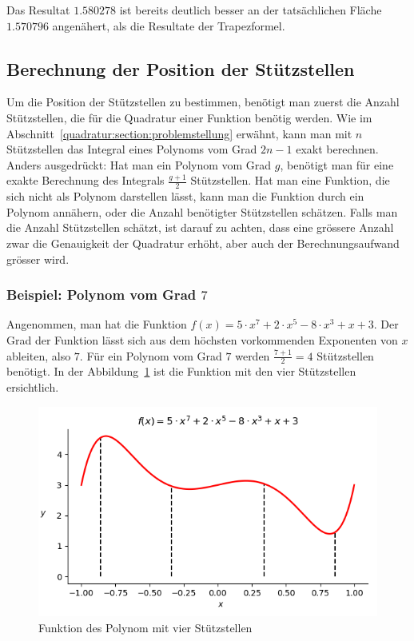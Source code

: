 \noindent
Das Resultat $1.580278$ ist bereits deutlich besser an der tatsächlichen Fläche $1.570796$ 
angenähert, als die Resultate der Trapezformel. 

\subsection{Berechnung der Position der Stützstellen
\label{quadratur:subsection:stützstellenberechnung}}
Um die Position der Stützstellen zu bestimmen, benötigt man zuerst die Anzahl Stützstellen, 
die für die Quadratur einer Funktion benötig werden.
\noindent
Wie im Abschnitt~\ref{quadratur:section:problemstellung} erwähnt, 
kann man mit $n$ Stützstellen das Integral eines Polynoms vom Grad $2n-1$ exakt berechnen.
Anders ausgedrückt: Hat man ein Polynom vom Grad $g$, 
benötigt man für eine exakte Berechnung des Integrals $\frac{g+1}{2}$ Stützstellen.
Hat man eine Funktion, die sich nicht als Polynom darstellen lässt, 
kann man die Funktion durch ein Polynom annähern, 
oder die Anzahl benötigter Stützstellen schätzen.
Falls man die Anzahl Stützstellen schätzt, ist darauf zu achten, 
dass eine grössere Anzahl zwar die Genauigkeit der Quadratur erhöht,
aber auch der Berechnungsaufwand grösser wird.


\subsubsection{Beispiel: Polynom vom Grad $7$}
Angenommen, man hat die Funktion $f(x) = 5 \cdot x^{7} + 2 \cdot x^{5} - 8 \cdot x^{3} + x + 3$.
Der Grad der Funktion lässt sich aus dem höchsten vorkommenden Exponenten von $x$ ableiten,
also $7$.
Für ein Polynom vom Grad $7$ werden $\frac{7+1}{2} = 4$ Stützstellen benötigt.
In der Abbildung~\ref{quadratur:figure:polynom} ist die Funktion mit den vier 
Stützstellen ersichtlich.

\begin{figure}[!h]
    \centering
    \includegraphics[scale=0.7]{papers/quadratur/figures/polynom.png}
    \caption{ Funktion des Polynom mit vier Stützstellen
    \label{quadratur:figure:polynom}}
\end{figure}
\newpage


